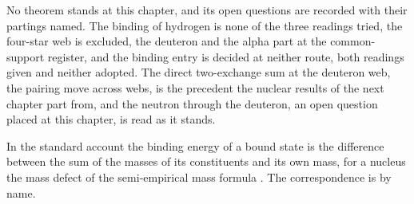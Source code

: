 No theorem stands at this chapter, and its open questions are recorded with their partings named. The binding of hydrogen is none of the three readings tried, the four-star web is excluded, the deuteron and the alpha part at the common-support register, and the binding entry is decided at neither route, both readings given and neither adopted. The direct two-exchange sum at the deuteron web, the pairing move across webs, is the precedent the nuclear results of the next chapter part from, and the neutron through the deuteron, an open question placed at this chapter, is read as it stands.
\begin{chbridge}
In the standard account the binding energy of a bound state is the difference between the sum of the masses of its constituents and its own mass, for a nucleus the mass defect of the semi-empirical mass formula \cite{Weizsaecker1935,BetheBacher1936}. The correspondence is by name.
\end{chbridge}
